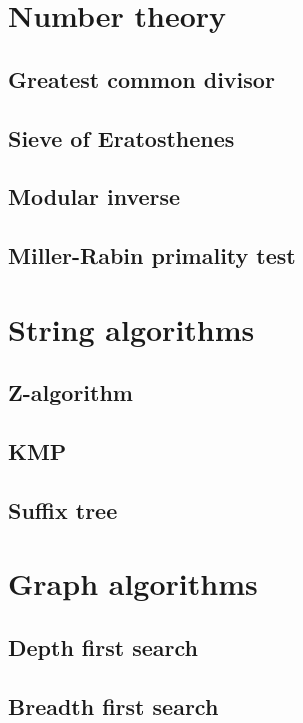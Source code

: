 \documentclass[a4paper,10pt]{article}
\begin{document}
\pagestyle{fancy}
\chead{}
\rhead{\thepage}
\lfoot{}
\cfoot{}
\rfoot{}


\tableofcontents
\newpage
\section{Number theory}
\subsection{Greatest common divisor}

\subsection{Sieve of Eratosthenes}

\subsection{Modular inverse}
\subsection{Miller-Rabin primality test}
\section{String algorithms}
\subsection{Z-algorithm}
\subsection{KMP}
\subsection{Suffix tree}
\section{Graph algorithms}
\subsection{Depth first search}
\subsection{Breadth first search}
\end{document}
